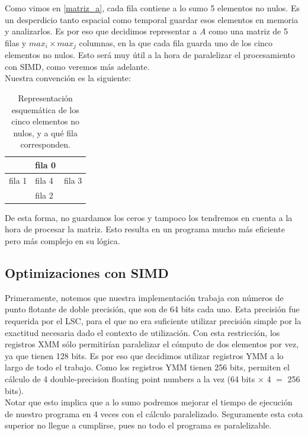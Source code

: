 \documentclass[a4paper]{article}
\begin{document}
Como vimos en \ref{matriz_a}, cada fila contiene a lo sumo 5 elementos no 
nulos. Es un desperdicio tanto espacial como temporal guardar esos elementos en memoria y analizarlos.
Es por eso que decidimos representar a $A$ como una matriz de 5 filas y $max_i \times max_j$ columnas, 
en la que cada fila guarda uno de los cinco elementos no nulos. Esto será muy útil a la hora de paralelizar
el procesamiento con SIMD, como veremos más adelante. \\
Nuestra convención es la siguiente: 

\begin{table}[!htbp]
\centering
\label{cincovecinos}
\begin{tabular}{l|l|l}
\cline{2-2}
                       & fila 0 &                       \\ \hline
\multicolumn{1}{|l|}{fila 1} & fila 4 & \multicolumn{1}{l|}{fila 3} \\ \hline
                       & fila 2 &                       \\ \cline{2-2}
\end{tabular}
\caption{Representación esquemática de los cinco elementos no nulos, y a qué fila corresponden.}
\end{table}

De esta forma, no guardamos los ceros y tampoco los tendremos en cuenta a la hora de procesar la 
matriz. Esto resulta en un programa mucho más eficiente pero más complejo en su lógica.

\subsection{Optimizaciones con SIMD} 

Primeramente, notemos que nuestra implementación trabaja con números de punto flotante de doble
precisión, que son de 64 bits cada uno. Esta precisión fue requerida por el LSC, para el que no
era suficiente utilizar precisión simple por la exactitud necesaria dado el contexto de utilización.
Con esta restricción, los registros XMM sólo permitirían paralelizar el cómputo de dos elementos por vez,
ya que tienen 128 bits. Es por eso que decidimos utilizar registros YMM a lo largo de todo el trabajo.
Como los registros YMM tienen 256 bits, permiten el cálculo de 4 double-precision floating point numbers
a la vez (64 bits $\times$ 4 $=$ 256 bits).\\
Notar que esto implica que a lo sumo podremos mejorar el tiempo de ejecución de nuestro programa en 4 veces
con el cálculo paralelizado. Seguramente esta cota superior no llegue a cumplirse, pues no todo el programa
es paralelizable.\\
\end{document}
